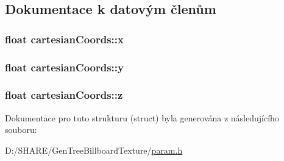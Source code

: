 \subsection{Dokumentace k datovým členům}
\hypertarget{structcartesian_coords_a611f0b0a050adee6c4cb3398c7ef73f9}{
\subsubsection[{x}]{\setlength{\rightskip}{0pt plus 5cm}float {\bf cartesianCoords::x}}}
\label{structcartesian_coords_a611f0b0a050adee6c4cb3398c7ef73f9}
\hypertarget{structcartesian_coords_af09a4d8f8eca9bfe7f68c3de3d01063a}{
\subsubsection[{y}]{\setlength{\rightskip}{0pt plus 5cm}float {\bf cartesianCoords::y}}}
\label{structcartesian_coords_af09a4d8f8eca9bfe7f68c3de3d01063a}
\hypertarget{structcartesian_coords_a29f24fb9803e670a7bc635fe84cc5643}{
\subsubsection[{z}]{\setlength{\rightskip}{0pt plus 5cm}float {\bf cartesianCoords::z}}}
\label{structcartesian_coords_a29f24fb9803e670a7bc635fe84cc5643}


Dokumentace pro tuto strukturu (struct) byla generována z následujícího souboru:\begin{DoxyCompactItemize}
\item 
D:/SHARE/GenTreeBillboardTexture/\hyperlink{param_8h}{param.h}\end{DoxyCompactItemize}
